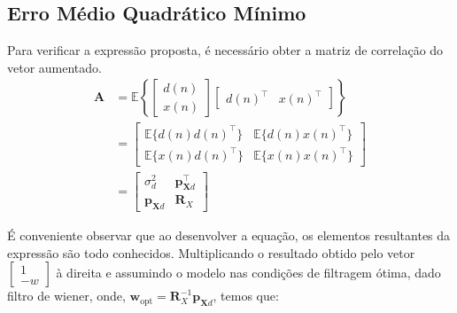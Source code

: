 \subsection{Erro Médio Quadrático Mínimo}
Para verificar a expressão proposta, é necessário obter a matriz de correlação do vetor aumentado.
\begin{align*}
    \mathbf{A} &= \mathbb{E} \left\{ \left[ \begin{matrix} d(n) \\ x(n) \end{matrix} \right] \left[ \begin{matrix} d(n)^{\top} & x(n)^{\top} \end{matrix} \right] \right\} \\
    &= \left[ \begin{matrix} \mathbb{E}\{d(n) d(n)^{\top}\} & \mathbb{E}\{d(n) x(n)^{\top}\} \\ \mathbb{E}\{x(n) d(n)^{\top}\} & \mathbb{E}\{x(n) x(n)^{\top}\} \end{matrix} \right] \\
    &=  \left[ \begin{matrix} \sigma^{2}_{d} & \mathbf{p}_{\mathbf{X} d}^{\top} \\
        \mathbf{p}_{\mathbf{X} d} & \mathbf{R}_{X} \end{matrix} \right]
\end{align*}

É conveniente observar que ao desenvolver a equação, os elementos resultantes da expressão são todo conhecidos. Multiplicando o resultado obtido pelo vetor $\left[\begin{matrix}1 \\ -w \end{matrix} \right]$ à direita e assumindo o modelo nas condições de filtragem ótima, dado filtro de wiener, onde, $\mathbf{w}_{\text{opt}} = \mathbf{R}^{-1}_{X} \mathbf{p}_{\mathbf{X} d}$, temos que:

